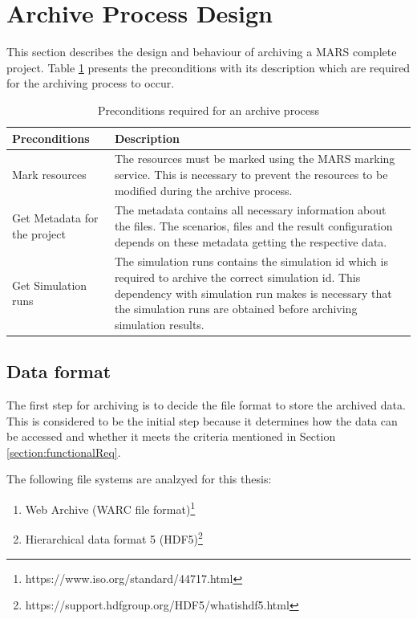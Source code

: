 \section{Archive Process Design}
This section describes the design and behaviour of archiving a MARS complete project. Table \ref{table:preconditionsArchive} presents the preconditions with its 
description which are required for the archiving process to occur. 

\begin{table}[H]
    \centering
    \begin{tabular}{|p{3cm}|p{11cm}|}
        \hline
            \textbf{Preconditions}  & \textbf{Description}\\
        \hline
            Mark resources & 
            The resources must be marked using the MARS marking service. This is necessary to prevent the resources to be modified during the archive process. \\
        \hline
            Get Metadata for the project
            & The metadata contains all necessary information about the files. The scenarios, files and the result configuration depends on these metadata getting 
            the respective data.\\  
        \hline
            Get Simulation runs & The simulation runs contains the simulation id which is required to archive the correct simulation id. This dependency
            with simulation run makes is necessary that the simulation runs are obtained before archiving simulation results. \\
        \hline
    \end{tabular}
    \caption{Preconditions required for an archive process}
    \label{table:preconditionsArchive}     
\end{table}    

\subsection{Data format}
The first step for archiving is to decide the file format to store the archived data. This is
considered to be the initial step because it determines how the data can be accessed and whether it meets
the criteria mentioned in Section \ref{section:functionalReq}.

\par
The following file systems are analzyed for this thesis:
\begin{enumerate}
    \item Web Archive (WARC file format)\footnote{https://www.iso.org/standard/44717.html}
    \item Hierarchical data format 5 (HDF5)\footnote{https://support.hdfgroup.org/HDF5/whatishdf5.html}
\end{enumerate}

